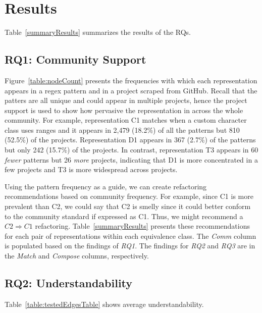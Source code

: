 \section{Results}
\label{sec:results}
Table~\ref{summaryResults} summarizes the results of the RQs.



\subsection{RQ1: Community Support}
Figure~\ref{table:nodeCount} presents the frequencies with which each representation appears in a regex pattern and in a project scraped from GitHub. Recall that the patters are all unique and could appear in multiple projects, hence the project support is used to show how pervasive the representation in across the whole community. For example, representation C1 matches when a custom character class uses ranges and it appears in 2,479 (18.2\%) of all the patterns but 810 (52.5\%) of the projects. Representation D1 appears in 367 (2.7\%) of the patterns but only 242 (15.7\%) of the projects. In contrast, representation T3 appears in 60 \emph{fewer} patterns but 26 \emph{more} projects, indicating that D1 is more concentrated in a few projects and T3 is more widespread across projects.

Using the pattern frequency as a guide, we can create refactoring recommendations based on community frequency. For example, since C1 is more prevalent than C2, we could say that C2 is smelly since it could better conform to the community standard if expressed as C1. Thus, we might recommend a $C2 \Rightarrow C1$ refactoring. Table~\ref{summaryResults} presents these recommendations for each pair of representations within each equivalence class. The \emph{Comm} column is populated based on the findings of \emph{RQ1}. The findings for \emph{RQ2} and \emph{RQ3} are in the \emph{Match} and \emph{Compose} columns, respectively.




\subsection{RQ2: Understandability}
Table~\ref{table:testedEdgesTable} shows average understandability.






